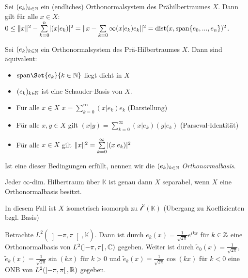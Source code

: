 \documentclass{cheat-sheet}
\newcommand{\K}{\mathbb{K}}
\newcommand{\dist}{\mathrm{dist}} %
\begin{document}
\begin{lem}
  Sei $(e_k)_{k \in \mathbb{N}}$ ein (endliches) Orthonormalsystem des Prähilbertraumes $X$. Dann gilt für alle $x \in X$: $0 \leq \|x\|^2 - \sum_{k=0}^n \abs{(x|e_k)}^2 = \| x - \sum_{k=0}\infty (x | e_k) e_k \|^2 = \dist(x, \mathrm{span} \{ e_0, ..., e_n \})^2$.
\end{lem}

\begin{satz}
  Sei $(e_k)_{k \in \mathbb{N}}$ ein Orthonormalsystem des Prä-Hilbertraumes $X$. Dann sind äquivalent:
  \begin{itemize}
    \item $\mathrm{span} \Set{ e_k }{ k \in \N }$ liegt dicht in $X$
    \item $(e_k)_{k \in \mathbb{N}}$ ist eine Schauder-Basis von $X$.
    \item Für alle $x \in X$ $x = \sum_{k=0}^\infty (x | e_k) e_k$ (Darstellung)
    \item Für alle $x, y \in X$ gilt $(x|y) = \sum_{k=0}^\infty (x|e_k) \overline{(y|e_k)}$ (Parseval-Identität)
    \item Für alle $x \in X$ gilt $\| x \|^2 = \sum_{k=0}^\infty \abs{(x|e_k)}^2$
  \end{itemize}
\end{satz}

\begin{defn}
  Ist eine dieser Bedingungen erfüllt, nennen wir die $(e_k)_{k \in \mathbb{N}}$ \emph{Orthonormalbasis}.
\end{defn}

\begin{satz}
  Jeder $\infty$-dim. Hilbertraum über $\K$ ist genau dann $X$ separabel, wenn $X$ eine Orthonormalbasis besitzt.
\end{satz}

\begin{bem}
  In diesem Fall ist $X$ isometrisch isomorph zu $\mathcal{l}^2(\K)$ (Übergang zu Koeffizienten bzgl. Basis)
\end{bem}



\begin{bsp}
  Betrachte $L^2(\left] -\pi, \pi \right[, \K)$. Dann ist durch $e_k(x) = \frac{1}{\sqrt{2\pi}} e^{ikx}$ für $k \in \mathbb{Z}$ eine Orthonormalbasis von $L^2(\left] -\pi, \pi \right[, \mathbb{C})$ gegeben. Weiter ist durch $\widetilde{e}_0(x) = \frac{1}{\sqrt{2\pi}}$, $\widetilde{e}_{k}(x) = \frac{1}{\sqrt{2\pi}} \sin(kx)$ für $k > 0$ und $\widetilde{e}_k(x) = \frac{1}{\sqrt{2 \pi}} \cos(kx)$ für $k < 0$ eine ONB von $L^2(\left] -\pi, \pi \right[, \mathbb{R})$ gegeben.
\end{bsp}
\end{document}
